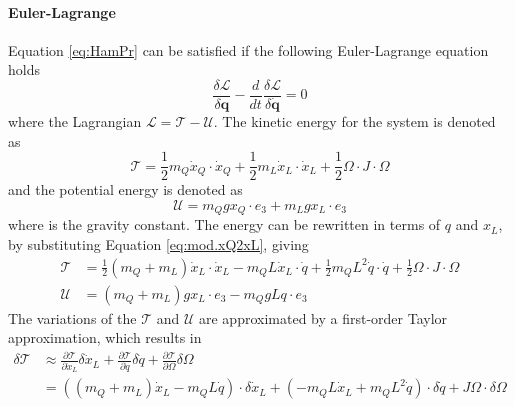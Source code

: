 \paragraph{Euler-Lagrange} Equation \ref{eq:HamPr} can be satisfied if the following Euler-Lagrange equation holds
\begin{equation}\label{key}
\frac{\delta \mathcal{L}}{\delta \mathbf{q}}-\frac{d}{dt}\frac{\delta \mathcal{L}}{\delta \dot{\mathbf{q}}}=0
\end{equation}
where the Lagrangian $ \mathcal{L}=\mathcal{T}-\mathcal{U} $.
The kinetic energy for the system is denoted as
\begin{equation}\label{key}
\mathcal{T}=\frac{1}{2}m_Q\dot{x}_Q\cdot\dot{x}_Q+\frac{1}{2}m_L\dot{x}_L\cdot\dot{x}_L+\frac{1}{2}\Omega \cdot J\cdot\Omega
\end{equation}
and the potential energy is denoted as
\begin{equation}\label{key}
\mathcal{U}=m_Qgx_Q\cdot e_3+m_Lgx_L\cdot e_3
\end{equation}
where  is the gravity constant.
The energy can be rewritten in terms of $ q $ and $ x_L $, by substituting Equation \ref{eq:mod.xQ2xL}, giving
\begin{align}\label{key}
\mathcal{T}&=\frac{1}{2}(m_Q+m_L)\dot{x}_L\cdot\dot{x}_L -m_QL\dot{x}_L\cdot\dot{q} + \frac{1}{2}m_QL^2\dot{q}\cdot\dot{q}+\frac{1}{2}\Omega \cdot J\cdot\Omega\\
\mathcal{U}&=(m_Q+m_L)gx_L\cdot e_3-m_QgLq\cdot e_3
\end{align}
The variations of the $ \mathcal{T} $ and $ \mathcal{U} $ are approximated by a first-order Taylor approximation, which results in
\begin{equation}\label{eq:mod.T}
\begin{aligned}
\delta\mathcal{T}&\approx \frac{\partial \mathcal{T}}{\partial\dot{x}_L} \delta\dot{x}_L +\frac{\partial \mathcal{T}}{\partial\dot{q}}\delta\dot{q}+\frac{\partial \mathcal{T}}{\partial\Omega}\delta\Omega\\
&=((m_Q+m_L)\dot{x}_L-m_QL\dot{q})\cdot\delta\dot{x}_L+(-m_QL\dot{x}_L+m_QL^2\dot{q})\cdot\delta\dot{q}+J\Omega\cdot\delta\Omega
\end{aligned}
\end{equation}


